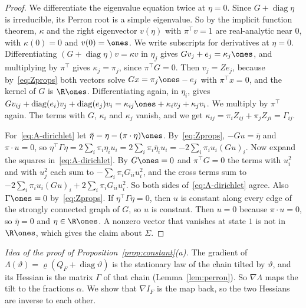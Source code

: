 \begin{proof}
We differentiate the eigenvalue equation twice at $\eta=0$. Since
$G+\operatorname{diag}\eta$ is irreducible, its Perron root is a simple
eigenvalue. So by the implicit function theorem, $\kappa$ and the right
eigenvector $v(\eta)$ with $\pi^\top v=1$ are real-analytic near $0$, with
$\kappa(0)=0$ and $v(0)=\ones$. We write subscripts for derivatives at
$\eta=0$. Differentiating $(G+\operatorname{diag}\eta)v=\kappa v$ in $\eta_j$
gives $Gv_j+e_j=\kappa_j\ones$, and multiplying by $\pi^\top$ gives
$\kappa_j=\pi_j$, since $\pi^\top G=0$. Then $v_j=Ze_j$, because
by~\eqref{eq:Zprops} both vectors solve $Gx=\pi_j\ones-e_j$ with
$\pi^\top x=0$, and the kernel of $G$ is $\R\ones$. Differentiating again, in
$\eta_i$, gives
$Gv_{ij}+\operatorname{diag}(e_i)v_j+\operatorname{diag}(e_j)v_i
=\kappa_{ij}\ones+\kappa_iv_j+\kappa_jv_i$. We multiply by $\pi^\top$ again.
The terms with $G$, $\kappa_i$ and $\kappa_j$ vanish, and we get
$\kappa_{ij}=\pi_iZ_{ij}+\pi_jZ_{ji}=\Gamma_{ij}$.

For~\eqref{eq:A-dirichlet} let $\bar\eta=\eta-(\pi\cdot\eta)\ones$.
By~\eqref{eq:Zprops}, $-Gu=\bar\eta$ and $\pi\cdot u=0$, so
$\eta^\top\Gamma\eta=2\sum_i\pi_i\eta_iu_i=2\sum_i\pi_i\bar\eta_iu_i
=-2\sum_i\pi_iu_i(Gu)_i$. Now expand the squares in~\eqref{eq:A-dirichlet}.
By $G\ones=0$ and $\pi^\top G=0$ the terms with $u_i^2$ and with $u_j^2$ each
sum to $-\sum_i\pi_iG_{ii}u_i^2$, and the cross terms sum to
$-2\sum_i\pi_iu_i(Gu)_i+2\sum_i\pi_iG_{ii}u_i^2$. So both sides
of~\eqref{eq:A-dirichlet} agree. Also $\Gamma\ones=0$ by~\eqref{eq:Zprops}.
If $\eta^\top\Gamma\eta=0$, then $u$ is constant along every edge of the
strongly connected graph of $G$, so $u$ is constant. Then $u=0$ because
$\pi\cdot u=0$, so $\bar\eta=0$ and $\eta\in\R\ones$. A nonzero vector that vanishes
at state $1$ is not in $\R\ones$, which gives the claim about $\Sigma$.
\end{proof}

\emph{Idea of the proof of Proposition~\ref{prop:constant}(a).} The gradient
of $\Lambda(\vartheta)=\varrho(Q_F+\operatorname{diag}\vartheta)$ is the
stationary law of the chain tilted by $\vartheta$, and its Hessian is the
matrix $\Gamma$ of that chain (Lemma~\ref{lem:perron}). So $\nabla\Lambda$
maps the tilt to the fractions $\alpha$. We show that $\nabla I_F$ is the map
back, so the two Hessians are inverse to each other.

